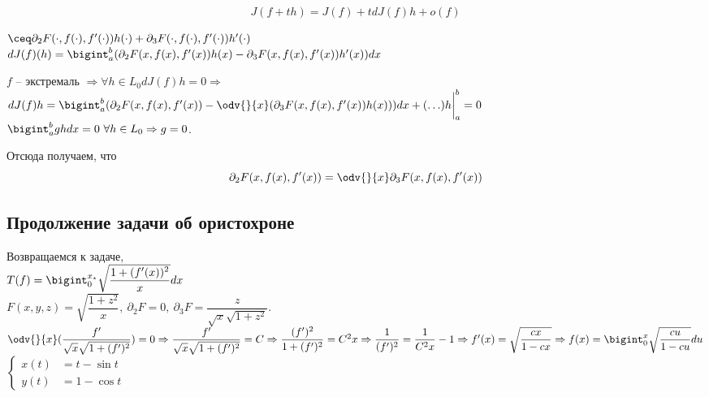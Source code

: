 \[J(f + th) = J(f) + tdJ(f)h + o(f)\]

$\ceq \partial_2 F(\cdot, f(\cdot), f'(\cdot))h(\cdot) + \partial_3 F(\cdot, f(\cdot), f'(\cdot))h'(\cdot)$\\
$dJ(f)(h) = \bigint_a^b(\partial_2 F(x, f(x), f'(x))h(x) - \partial_3 F(x, f(x), f'(x))h'(x)) dx$

$f$ -- экстремаль $\Rightarrow \forall h \in L_0 dJ(f)h = 0 \Rightarrow$\\
$dJ(f)h = \bigint_a^b(\partial_2 F(x, f(x), f'(x)) - \odv{}{x}(\partial_3F(x, f(x), f'(x))h(x))) dx + (\ldots) h\bigg|_a^b = 0$\\
$\bigint_a^bghdx = 0\ \forall h \in L_0 \Rightarrow g = 0$.

Отсюда получаем, что
\[\partial_2F(x, f(x), f'(x)) = \odv{}{x}\partial_3F(x, f(x), f'(x))\]

\subsection{Продолжение задачи об ористохроне}

Возвращаемся к задаче,\\
$T(f) = \bigint_0^{x_{\star}} \sqrt{\dfrac{1 + (f'(x))^2}{x}}dx$\\
$F(x, y, z) = \sqrt{\dfrac{1 + z^2}{x}}, \ \partial_2F = 0, \ \partial_3F = \dfrac{z}{\sqrt{x}\sqrt{1 + z^2}}$.\\
$\odv{}{x}(\dfrac{f'}{\sqrt{x}\sqrt{1 + (f')^2}}) = 0 \Rightarrow \dfrac{f'}{\sqrt{x}\sqrt{1 + (f')^2}} = C \Rightarrow \dfrac{(f')^2}{1 + (f')^2} = C^2x \Rightarrow \dfrac1{(f')^2} = \dfrac1{C^2x} - 1 \Rightarrow f'(x) = \sqrt{\dfrac{cx}{1 - cx}} \Rightarrow f(x) = \bigint_0^x\sqrt{\dfrac{cu}{1 - cu}}du$\\

$\left\{\begin{aligned}
x(t) &= t - \sin t \\
y(t) &= 1 - \cos t
\end{aligned}\right.$



